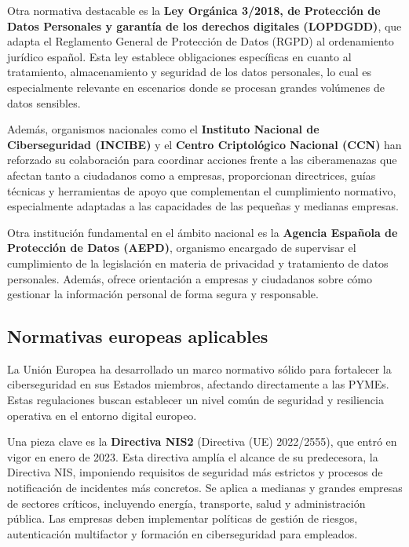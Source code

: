 \documentclass[a4paper, 10pt]{article}
\begin{document}
Otra normativa destacable es la \textbf{Ley Orgánica 3/2018, de Protección de Datos Personales y garantía de los derechos digitales (LOPDGDD)}, que adapta el Reglamento General de Protección de Datos (RGPD) al ordenamiento jurídico español. Esta ley establece obligaciones específicas en cuanto al tratamiento, almacenamiento y seguridad de los datos personales, lo cual es especialmente relevante en escenarios donde se procesan grandes volúmenes de datos sensibles. \cite{boe}
\par\vspace{0.5cm}

Además, organismos nacionales como el \textbf{Instituto Nacional de Ciberseguridad (INCIBE)} y el \textbf{Centro Criptológico Nacional (CCN)}  han reforzado su colaboración para coordinar acciones frente a las ciberamenazas que afectan tanto a ciudadanos como a empresas, 
proporcionan directrices, guías técnicas y herramientas de apoyo que complementan el cumplimiento normativo, 
especialmente adaptadas a las capacidades de las pequeñas y medianas empresas. \cite{escudo2023}
\par\vspace{0.5cm}

Otra institución fundamental en el ámbito nacional es la \textbf{Agencia Española de Protección de Datos (AEPD)}, organismo encargado de supervisar el cumplimiento de la legislación en materia de privacidad y tratamiento de datos personales. Además, ofrece orientación a empresas y ciudadanos sobre cómo gestionar la información personal de forma segura y responsable.


\subsection{Normativas europeas aplicables}

La Unión Europea ha desarrollado un marco normativo sólido para fortalecer la ciberseguridad en sus Estados miembros, afectando directamente a las PYMEs. Estas regulaciones buscan establecer un nivel común de seguridad y resiliencia operativa en el entorno digital europeo.
\par\vspace{0.5cm}

Una pieza clave es la \textbf{Directiva NIS2} (Directiva (UE) 2022/2555), que entró en vigor en enero de 2023. Esta directiva amplía el alcance de su predecesora, la Directiva NIS, imponiendo requisitos de seguridad más estrictos y procesos de notificación de incidentes más concretos. Se aplica a medianas y grandes empresas de sectores críticos, incluyendo energía, transporte, salud y administración pública. Las empresas deben implementar políticas de gestión de riesgos, autenticación multifactor y formación en ciberseguridad para empleados. \cite{cadena_ser}
\par\vspace{0.5cm}
\end{document}
